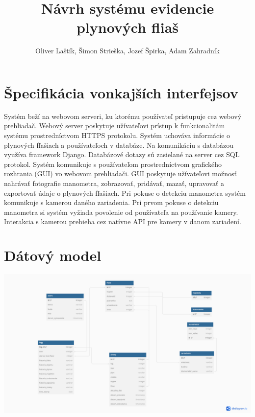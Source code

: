 \documentclass{zah}
\title{Návrh systému evidencie plynových fliaš}
\author{Oliver Laštík, Šimon Strieška, Jozef Špirka, Adam Zahradník}
\begin{document}
\maketitle

\tableofcontents
\cleardoublepage

\section{Špecifikácia vonkajších interfejsov}

Systém beží na webovom serveri, ku ktorému používateľ pristupuje cez webový prehliadač. Webový server poskytuje užívateľovi prístup k funkcionalitám systému prostredníctvom HTTPS protokolu. Systém uchováva informácie o plynových fľašiach a používateľoch v databáze. Na komunikáciu s databázou využíva framework Django. Databázové dotazy sú zasielané na server cez SQL protokol. Systém komunikuje s používateľom prostredníctvom grafického rozhrania (GUI) vo webovom prehliadači. GUI poskytuje užívateľovi možnosť nahrávať fotografie manometra, zobrazovať, pridávať, mazať, upravovať a exportovať údaje o plynových fľašiach. Pri pokuse o detekciu manometra systém komunikuje s kamerou daného zariadenia. Pri prvom pokuse o detekciu manometra si systém vyžiada povolenie od používateľa na používanie kamery. Interakcia s kamerou prebieha cez natívne API pre kamery v danom zariadení.

\section{Dátový model}

\includegraphics[page=2,width=\textwidth]{navrh-assets/db}
\end{document}
